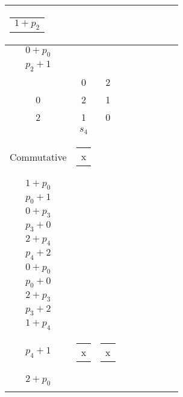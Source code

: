 \begin{longtable}{|c|c|c|c|c|c|c|c|c|}
\begin{tabular}{@{}c@{}}
    \( 1 + p_{2} \)
\end{tabular} & \cellcolor{yellow}\begin{tabular}{@{}c@{}}
    \\\hline
    \( 0 + p_{0} \)\\\hline
    \( p_{2} + 1 \)
\end{tabular}\\\hline
    \( \begin{smallmatrix}
    1 & 0 & 2\\
    0 & 2 & 1\\
    2 & 1 & 0\\
\end{smallmatrix} \) & \( s_{4} \) & \begin{tabular}{@{}c@{}}
    Quasigroup\\\hline
    Commutative\end{tabular} & \cellcolor{blue}\begin{tabular}{@{}c@{}}
    x
\end{tabular} & \cellcolor{yellow}\begin{tabular}{@{}c@{}}
    \\\hline
    \( 1 + p_{0} \)\\\hline
    \( p_{0} + 1 \)\\\hline
    \( 0 + p_{3} \)\\\hline
    \( p_{3} + 0 \)\\\hline
    \( 2 + p_{4} \)\\\hline
    \( p_{4} + 2 \)
\end{tabular} & \cellcolor{yellow}\begin{tabular}{@{}c@{}}
    \\\hline
    \( 0 + p_{0} \)\\\hline
    \( p_{0} + 0 \)\\\hline
    \( 2 + p_{3} \)\\\hline
    \( p_{3} + 2 \)\\\hline
    \( 1 + p_{4} \)\\\hline
    \( p_{4} + 1 \)
\end{tabular} & \cellcolor{blue}\begin{tabular}{@{}c@{}}
    x
\end{tabular} & \cellcolor{blue}\begin{tabular}{@{}c@{}}
    x
\end{tabular} & \cellcolor{yellow}\begin{tabular}{@{}c@{}}
    \\\hline
    \( 2 + p_{0} \)\\\hline

\end{tabular}
\end{longtable}
